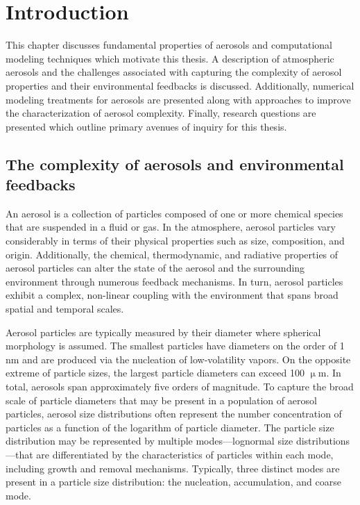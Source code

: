 \chapter{Introduction}

This chapter discusses fundamental properties of aerosols and computational modeling techniques which motivate this thesis. A description of atmospheric aerosols and the challenges associated with capturing the complexity of aerosol properties and their environmental feedbacks is discussed. Additionally, numerical modeling treatments for aerosols are presented along with approaches to improve the characterization of aerosol complexity. Finally, research questions are presented which outline primary avenues of inquiry for this thesis.  

\section{The complexity of aerosols and environmental feedbacks}

An aerosol is a collection of particles composed of one or more chemical species that are suspended in a fluid or gas. In the atmosphere, aerosol particles vary considerably in terms of their physical properties such as size, composition, and origin. Additionally, the chemical, thermodynamic, and radiative properties of aerosol particles can alter the state of the aerosol and the surrounding environment through numerous feedback mechanisms. In turn, aerosol particles exhibit a complex, non-linear coupling with the environment that spans broad spatial and temporal scales.

Aerosol particles are typically measured by their diameter where spherical morphology is assumed. The smallest particles have diameters on the order of 1 nm and are produced via the nucleation of low-volatility vapors. On the opposite extreme of particle sizes, the largest particle diameters can exceed 100 $\upmu$m. In total, aerosols span approximately five orders of magnitude. To capture the broad scale of particle diameters that may be present in a population of aerosol particles, aerosol size distributions often represent the number concentration of particles as a function of the logarithm of particle diameter. The particle size distribution may be represented by multiple modes---lognormal size distributions---that are differentiated by the characteristics of particles within each mode, including growth and removal mechanisms. Typically, three distinct modes are present in a particle size distribution: the nucleation, accumulation, and coarse mode. 

